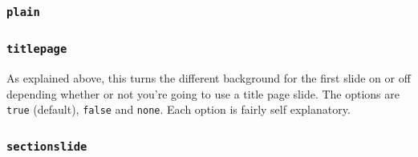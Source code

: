 \documentclass[a4paper,oneside,11pt]{article}
\newcommand{\key}[1]{\texttt{\color{UOWorange}#1}}
\newcommand{\val}[1]{\texttt{\color{UOWblue}#1}}
\begin{document}
\subsubsection*{\val{plain}}%
\par


\subsubsection*{\key{titlepage}}
As explained above, this turns the different background for the first slide on or off depending whether or not you're going to use a title page slide. The options are \val{true} (default), \val{false} and \val{none}. Each option is fairly self explanatory.


\subsubsection*{\key{sectionslide}}
\par
\end{document}
